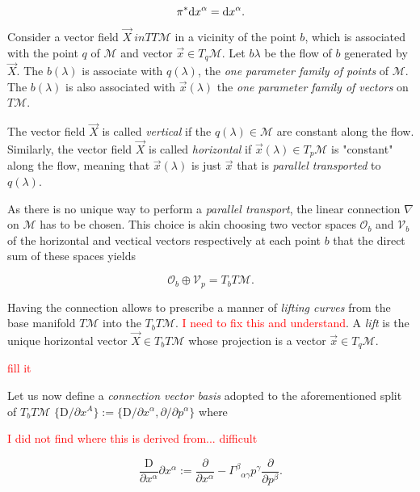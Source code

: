 \begin{equation}
\pi^* {\text d} x^{\alpha} = {\text d} x^{\alpha}.
\end{equation}

Consider a vector field $\vec{X} \ in TT\mathcal{M}$ in a vicinity of the point $b$, which is associated with the point $q$ of $\mathcal{M}$ and vector $\vec{x}\in T_{q}\mathcal{M}$. 
Let $b{\lambda}$ be the flow of $b$ generated by $\vec{X}$. 
The $b(\lambda)$ is associate with $q(\lambda)$, the \textit{one parameter family of points} of $\mathcal{M}$. 
The $b(\lambda)$ is also associated with $\vec{x}(\lambda)$ the \textit{one parameter family of vectors} on $T\mathcal{M}$.

The vector field $\vec{X}$ is called \textit{vertical} if the $q(\lambda)\in\mathcal{M}$ are constant along the flow.
Similarly, the vector field $\vec{X}$ is called \textit{horizontal} if $\vec{x}(\lambda)\in T_p \mathcal{M}$ is "constant" along the flow, meaning that $\vec{x}(\lambda)$ is just $\vec{x}$ that is \textit{parallel transported} to $q(\lambda)$.

As there is no unique way to perform a \textit{parallel transport}, the linear connection $\nabla$ on $\mathcal{M}$ has to be chosen. 
This choice is akin choosing two vector spaces $\mathcal{O}_b$ and $\mathcal{V}_b$ of the horizontal and vectical vectors respectively at each point $b$ that the direct sum of these spaces yields

\begin{equation}
\mathcal{O}_b\oplus \mathcal{V}_p = T_b T\mathcal{M}.
\end{equation}

Having the connection allows to prescribe a manner of \textit{lifting curves} from the base manifold $T\mathcal{M}$ into the $T_b T\mathcal{M}$.
\textcolor{red}{I need to fix this and understand}. 
A \textit{lift} is the unique horizontal vector $\vec{X}\in T_bT\mathcal{M}$ whose projection is a vector $\vec{x}\in T_q\mathcal{M}$.

\textcolor{red}{fill it}

Let us now define a \textit{connection vector basis} adopted to the aforementioned split of $T_b T\mathcal{M}$ $\{\text{D}/\partial x^A \}:=\{\text{D}/\partial x^{\alpha}, \partial/\partial p^{\alpha} \}$ where 

\textcolor{red}{I did not find where this is derived from... difficult}

\begin{equation}
\frac{\text{D}}{\partial x^{\alpha}}{\partial x^{\alpha}} := \frac{\partial}{\partial x^{\alpha}} - {\Gamma^{\beta}}_{\alpha\gamma}p^{\gamma}\frac{\partial}{\partial p^{\beta}}.
\end{equation}

